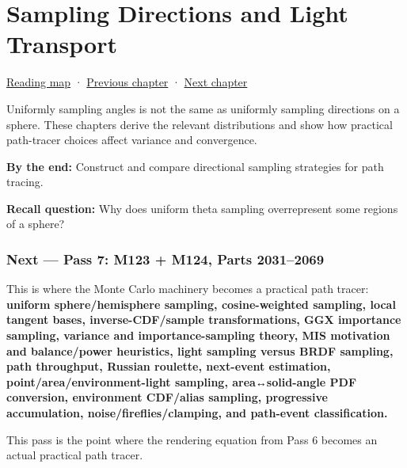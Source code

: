 \chapter{Sampling Directions and Light Transport}\label{03-visual-computing-i-ch008-sampling-directions-and-light-transport}\hypertarget{03-visual-computing-i-ch008}{}\label{stagechapter:03-visual-computing-i-ch008}

\hypertarget{03-visual-computing-i-ch008-sampling-directions-and-light-transport}{}

\hyperref[volume-reading-map]{Reading map} · \hyperref[03-visual-computing-i-ch007-the-rendering-equation-and-path-probabilities]{Previous chapter} · \hyperref[03-visual-computing-i-ch009-point-lights-mis-and-environment-lighting]{Next chapter}

Uniformly sampling angles is not the same as uniformly sampling directions on a sphere. These chapters derive the relevant distributions and show how practical path-tracer choices affect variance and convergence.

\textbf{By the end:} Construct and compare directional sampling strategies for path tracing.

\textbf{Recall question:} Why does uniform theta sampling overrepresent some regions of a sphere?

\subsection{Next --- Pass 7: M123 + M124, Parts 2031--2069}\label{03-visual-computing-i-ch008-next-pass-7-m123-m124-parts-20312069}

\hypertarget{03-visual-computing-i-ch008-next-pass-7-m123-m124-parts-20312069}{}

This is where the Monte Carlo machinery becomes a practical path tracer: \textbf{uniform sphere/hemisphere sampling, cosine-weighted sampling, local tangent bases, inverse-CDF/sample transformations, GGX importance sampling, variance and importance-sampling theory, MIS motivation and balance/power heuristics, light sampling versus BRDF sampling, path throughput, Russian roulette, next-event estimation, point/area/environment-light sampling, area↔solid-angle PDF conversion, environment CDF/alias sampling, progressive accumulation, noise/fireflies/clamping, and path-event classification.}

This pass is the point where the rendering equation from Pass 6 becomes an actual practical path tracer.

